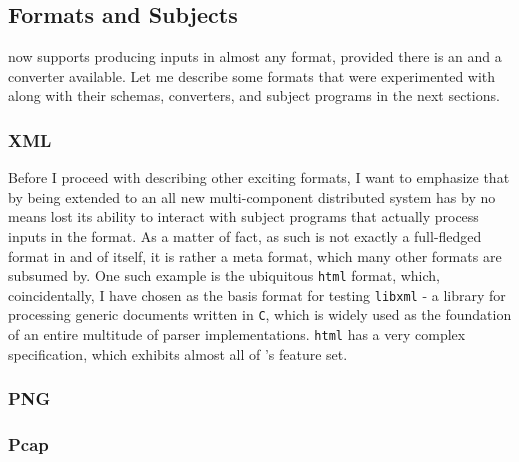 \subsection{Formats and Subjects}
\xmlmate now supports producing inputs in almost any format, provided there is an \xsd and a converter
available. Let me describe some formats that were experimented with along with their schemas, converters, and
subject programs in the next sections.
\subsubsection{XML}
Before I proceed with describing other exciting formats, I want to emphasize that by being extended to an all
new multi-component distributed system \xmlmate has by no means lost its ability to interact with subject
programs that actually process inputs in the \xml format. As a matter of fact, \xml as such is not exactly a
full-fledged format in and of itself, it is rather a meta format, which many other formats are subsumed by. One
such example is the ubiquitous \texttt{html} format, which, coincidentally, I have chosen as the basis format
for testing \texttt{libxml} - a library for processing generic \xml documents written in \texttt{C}, which is
widely used as the foundation of an entire multitude of parser implementations. 
\texttt{html} has a very complex specification, which exhibits almost all of \xml's feature set.
\subsubsection{PNG}
 
\subsubsection{Pcap}
 
 
